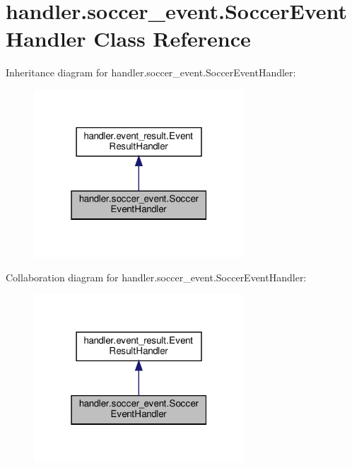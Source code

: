 \hypertarget{classhandler_1_1soccer__event_1_1_soccer_event_handler}{}\section{handler.\+soccer\+\_\+event.\+Soccer\+Event\+Handler Class Reference}
\label{classhandler_1_1soccer__event_1_1_soccer_event_handler}


Inheritance diagram for handler.\+soccer\+\_\+event.\+Soccer\+Event\+Handler\+:\nopagebreak
\begin{figure}[H]
\begin{center}
\leavevmode
\includegraphics[width=223pt]{classhandler_1_1soccer__event_1_1_soccer_event_handler__inherit__graph}
\end{center}
\end{figure}


Collaboration diagram for handler.\+soccer\+\_\+event.\+Soccer\+Event\+Handler\+:\nopagebreak
\begin{figure}[H]
\begin{center}
\leavevmode
\includegraphics[width=223pt]{classhandler_1_1soccer__event_1_1_soccer_event_handler__coll__graph}
\end{center}
\end{figure}
